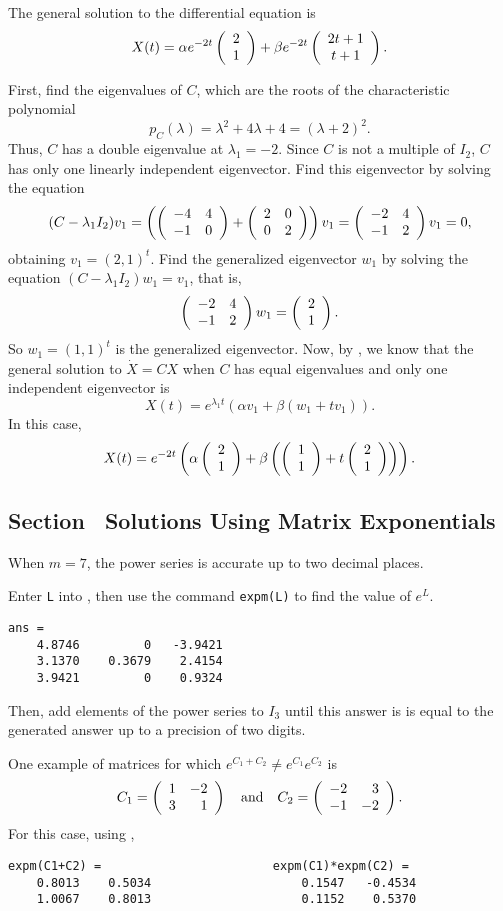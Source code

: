  \ans The general solution to the differential equation is
\[
X(t) = \alpha e^{-2t}\left(\begin{array}{c} 2 \\ 1\end{array}\right) + \beta e^{-2t}\left(\begin{array}{c} 2t + 1 \\ t + 1\end{array}\right).
\]

\soln First, find the eigenvalues of $C$, which are the roots of the
characteristic polynomial
\[
p_C(\lambda) = \lambda^2 + 4\lambda + 4 = (\lambda + 2)^2.
\]
Thus, $C$ has a double eigenvalue at $\lambda_1 = -2$.  Since $C$ is not
a multiple of $I_2$, $C$ has only one linearly independent eigenvector.
Find this eigenvector by solving the equation
\[
(C - \lambda_1I_2)v_1 = \left(\left(\begin{array}{rr} -4 & 4\\ -1 &0\end{array}\right) + \left(\begin{array}{rr} 2 & 0\\ 0 &2\end{array}\right)
\right)v_1 = \left(\begin{array}{rr} -2 & 4\\ -1 &2\end{array}\right)v_1 = 0,
\]
obtaining $v_1 = (2,1)^t$.  Find the generalized eigenvector $w_1$ by
solving the equation $(C - \lambda_1 I_2)w_1 = v_1$, that is,
\[
\left(\begin{array}{rr} -2 & 4\\ -1 &2\end{array}\right)w_1 = \left(\begin{array}{r} 2 \\ 1\end{array}\right).
\]
So $w_1 = (1,1)^t$ is the generalized eigenvector.
Now, by , we know that the
general solution to $\dot{X} = CX$ when $C$ has equal eigenvalues and only
one independent eigenvector is
\[
X(t) = e^{\lambda_1 t}(\alpha v_1 + \beta(w_1 + tv_1)).
\]
In this case,
\[
X(t) = e^{-2t}\left(\alpha \left(\begin{array}{r} 2 \\ 1\end{array}\right) + \beta\left(\left(\begin{array}{r} 1 \\ 1\end{array}\right) +
t\left(\begin{array}{r} 2 \\ 1\end{array}\right)\right)\right).
\]



\subsection*{Section~\protect{\ref{S:Matrixexp}} Solutions Using Matrix
Exponentials}

\ans When $m = 7$, the power series is accurate up to two decimal places.

\soln Enter {\tt L} into \Matlab, then use the command {\tt expm(L)} to
find the value of $e^L$.
\begin{verbatim}
ans = 
    4.8746         0   -3.9421
    3.1370    0.3679    2.4154
    3.9421         0    0.9324
\end{verbatim}
Then, add elements of the power series to $I_3$ until this answer is
is equal to the \Matlab generated answer up to a precision of two
digits.

One example of matrices for which $e^{C_1 + C_2} \neq e^{C_1}e^{C_2}$ is
\[ C_1 = \left(\begin{array}{rr} 1 & -2\\ 3 &1\end{array}\right) \quad\mbox{and}\quad C_2 = \left(\begin{array}{rr} -2 & 3\\ -1 &-2\end{array}\right). \]
For this case, using \Matlabp,
\begin{verbatim}
expm(C1+C2) =                        expm(C1)*expm(C2) =
    0.8013    0.5034                     0.1547   -0.4534
    1.0067    0.8013                     0.1152    0.5370
\end{verbatim}

